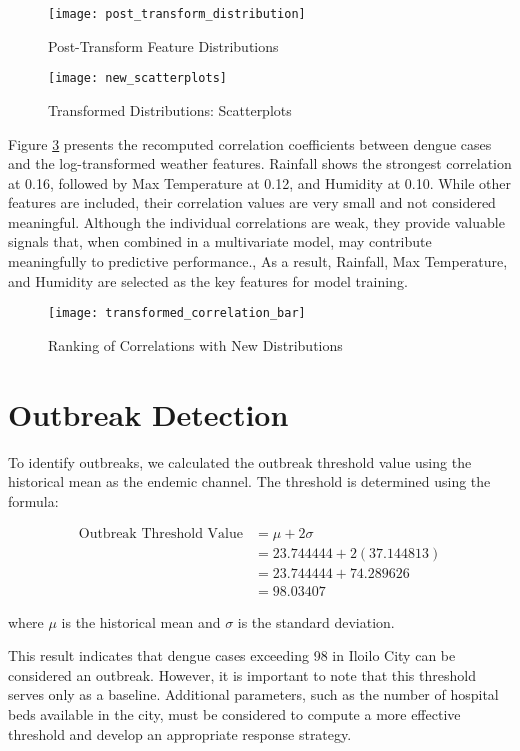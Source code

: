 \begin{figure}[hbt!]
	\centering
	\texttt{[image: post\_transform\_distribution]}
	\caption{Post-Transform Feature Distributions}
	\label{fig:post_transform_distribution}
\end{figure}

\begin{figure}[hbt!]
	\centering
	\texttt{[image: new\_scatterplots]}
	\caption{Transformed Distributions: Scatterplots}
	\label{fig:new_scatterplots}
\end{figure}

Figure \ref{fig:transformed_correlation_bar} presents the recomputed correlation coefficients between dengue cases and the log-transformed weather features. Rainfall shows the strongest correlation at 0.16, followed by Max Temperature at 0.12, and Humidity at 0.10. While other features are included, their correlation values are very small and not considered meaningful. Although the individual correlations are weak, they provide valuable signals that, when combined in a multivariate model, may contribute meaningfully to predictive performance., As a result, Rainfall, Max Temperature, and Humidity are selected as the key features for model training.

\begin{figure}[hbt!]
	\centering
	\texttt{[image: transformed\_correlation\_bar]}
	\caption{Ranking of Correlations with New Distributions}
	\label{fig:transformed_correlation_bar}
\end{figure}

\section{Outbreak Detection}  
To identify outbreaks, we calculated the outbreak threshold value using the historical mean as the endemic channel. The threshold is determined using the formula:  

\begin{align}  
	\text{Outbreak Threshold Value} &= \mu + 2\sigma \\  
	&= 23.744444 + 2(37.144813) \\  
	&= 23.744444 + 74.289626 \\  
	&= 98.03407  
\end{align}  

where \(\mu\) is the historical mean and \(\sigma \) is the standard deviation.

This result indicates that dengue cases exceeding 98 in Iloilo City can be considered an outbreak. However, it is important to note that this threshold serves only as a baseline. Additional parameters, such as the number of hospital beds available in the city, must be considered to compute a more effective threshold and develop an appropriate response strategy.

